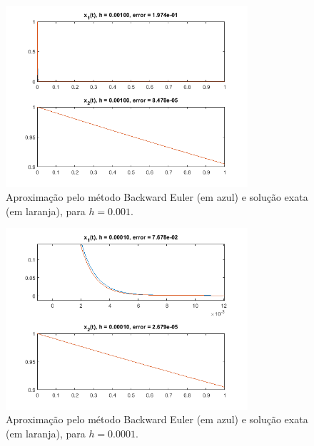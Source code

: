 \documentclass{article}
\begin{document}
\begin{enumerate}
\begin{enumerate}
                    \begin{figure}[!h]
                        \centering
                        \includegraphics[width=0.8\textwidth]{backward_3.png}
                        \caption{Aproximação pelo método Backward Euler (em azul) e
                        solução exata (em laranja), para $h = 0.001$.}
                        \label{fig:backward_3}
                    \end{figure}
                
                    \begin{figure}[!h]
                        \centering
                        \includegraphics[width=0.8\textwidth]{backward_4.png}
                        \caption{Aproximação pelo método Backward Euler (em azul) e
                        solução exata (em laranja), para $h = 0.0001$.}
                        \label{fig:backward_4}
                    \end{figure}

                    \clearpage


\end{enumerate}
\end{enumerate}
\end{document}
